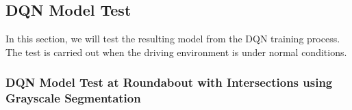 \documentclass[conference]{IEEEtran}
\begin{document}
	
	\subsection{DQN Model Test}
	\label{sec:pengujian_model_dqn}
	
	In this section, we will test the resulting model from the DQN training process. The test is carried out when the driving environment is under normal conditions.
	
	\subsubsection{DQN Model Test at Roundabout with Intersections using Grayscale Segmentation}
	\label{sec:pengujian_dqn_bundaran_simpangempat_segmentasi_grayscale}
	
\end{document}

